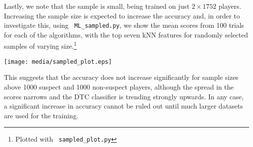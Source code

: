 \documentclass[11pt]{article} %
\begin{document}





Lastly, we note that the sample is small, being trained on just $2\times1752$ players.  Increasing
the sample size is expected to increase the accuracy and, in order to investigate this, using {\tt
  ML\_sampled.py}, we show the mean scores from 100 trials for each of the algorithms, with the top
seven kNN features for randomly selected samples of varying size.\footnote{Plotted with {\tt
  sampled\_plot.py}}

\texttt{[image: media/sampled\_plot.eps]}

This suggests that the accuracy does not increase significantly for sample sizes above
1000 suspect and 1000 non-suspect players, although the spread in the scores narrows and the
DTC classifier is trending strongly upwards.  In any case, a significant increase in accuracy cannot be
ruled out until much larger datasets are used for the training.

 
\end{document}
